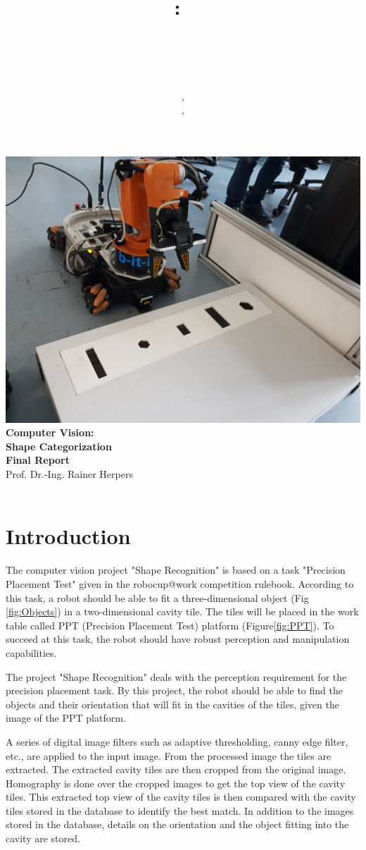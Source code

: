 \documentclass{article}
\title{
\vspace{2in}
\textmd{\textbf{\hmwkClass:\ \\ \hmwkTitle}}\\
\vspace{0.1in}\large{\hmwkClassInstructor\ }
\vspace{3in}
}
\author{\textbf{\hmwkAuthorName}, \hmwkfirstmat\\ \textbf{\hmwksecondauthor}, \hmwksecondmat}
\date{} %
\newcommand{\hmwkTitle}{Shape Categorization\\Final Report} %
\newcommand{\hmwkClass}{Computer Vision} %
\newcommand{\hmwkClassInstructor}{Prof. Dr.-Ing. Rainer Herpers} %
\newcommand{\hmwkimage}{\centering\includegraphics[draft=false, scale = 0.075]{images/FrontPicture.jpg}}
\begin{document}
\begin{titlepage}
\hmwkimage\\
\vspace{1in}
\textmd{\Huge\textbf{\hmwkClass:\ \\ \hmwkTitle}}\\
\vspace{0.1in}\large{\hmwkClassInstructor\ }
\vspace{3in}\\
\theauthor\
\thispagestyle{empty}
\end{titlepage}


\setcounter{page}{1}

\tableofcontents

\newpage


\section{Introduction}

 The computer vision project "Shape Recognition" is based on a task "Precision Placement Test" given in the robocup@work competition rulebook. According to this task, a robot should be able to fit a three-dimensional object (Fig \ref{fig:Objects}) in a two-dimensional cavity tile. The tiles will be placed in the work table called PPT (Precision Placement Test) platform (Figure\ref{fig:PPT}). To succeed at this task, the robot should have robust perception and manipulation capabilities.
 
	The project "Shape Recognition" deals with the perception requirement for the precision placement task.
By this project, the robot should be able to find the objects and their orientation that will fit in the cavities of the tiles, given the image of the PPT platform.

	A series of digital image filters such as adaptive thresholding, canny edge filter, etc.,  are applied to the input image. From the processed image the tiles are extracted. The extracted cavity tiles are then cropped from the original image. Homography is done over the cropped images to get the top view of the cavity tiles. This extracted top view of the cavity tiles is then compared with the cavity tiles stored in the database to identify the best match. In addition to the images stored in the database, details on the orientation and the object fitting into the cavity are stored.
\end{document}
